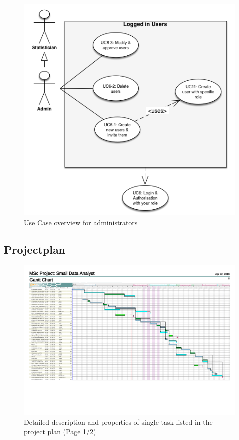 \begin{figure}[!ht]
\centering
\includegraphics[width=\textwidth]{figures/use_case_admin}
\caption{Use Case overview for administrators}
\label{fig:usecase:admin}
\end{figure}





\subsection{Projectplan}
\begin{figure}
	\centering
	\includegraphics[page=2,width=\textwidth]{appendix/Projectplan.pdf}
	\caption{Detailed description and properties of single task listed in the project plan (Page 1/2)}
	\label{fig:projectplan:details:1}
\end{figure}


